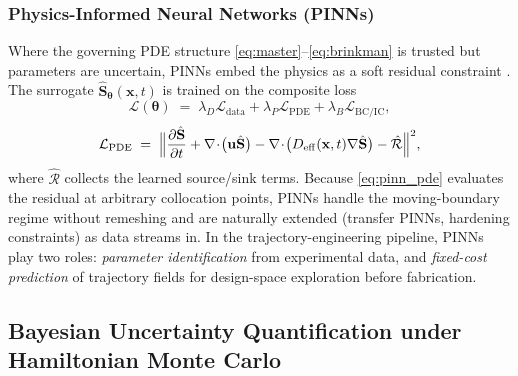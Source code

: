\documentclass[11pt]{article}
\newcommand{\pde}[2]{\frac{\partial #1}{\partial #2}}
\newcommand{\Veff}{D_{\mathrm{eff}}}
\begin{document}
\subsubsection{Physics-Informed Neural Networks (PINNs)}
Where the governing PDE structure \eqref{eq:master}--\eqref{eq:brinkman} is trusted but parameters are uncertain, PINNs embed the physics as a soft residual constraint \cite{Raissi2019}. The surrogate $\hat{\mathbf{S}}_{\boldsymbol{\theta}}(\mathbf{x},t)$ is trained on the composite loss
\begin{equation}
\mathcal{L}(\boldsymbol{\theta}) \;=\; \lambda_D\mathcal{L}_{\mathrm{data}} + \lambda_P\mathcal{L}_{\mathrm{PDE}} + \lambda_B\mathcal{L}_{\mathrm{BC/IC}},
\label{eq:pinn_loss}
\end{equation}
\begin{equation}
\mathcal{L}_{\mathrm{PDE}} \;=\; \Bigl\|\pde{\hat{\mathbf{S}}}{t} + \nabla\!\cdot\!\bigl(\mathbf{u}\hat{\mathbf{S}}\bigr) - \nabla\!\cdot\!\bigl(\Veff(\mathbf{x},t)\nabla\hat{\mathbf{S}}\bigr) - \hat{\mathcal{R}}\Bigr\|^{2},
\label{eq:pinn_pde}
\end{equation}
where $\hat{\mathcal{R}}$ collects the learned source/sink terms. Because \eqref{eq:pinn_pde} evaluates the residual at arbitrary collocation points, PINNs handle the moving-boundary regime without remeshing and are naturally extended (transfer PINNs, hardening constraints) as data streams in. In the trajectory-engineering pipeline, PINNs play two roles: \emph{parameter identification} from experimental data, and \emph{fixed-cost prediction} of trajectory fields for design-space exploration before fabrication.


\subsection{Bayesian Uncertainty Quantification under Hamiltonian Monte Carlo}
\end{document}
